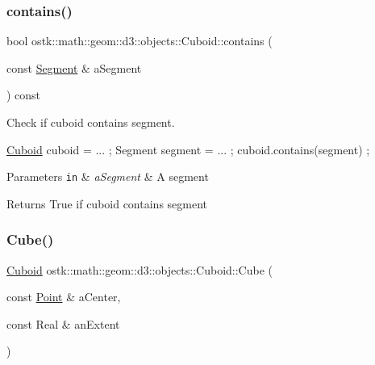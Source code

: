 \subsubsection{\texorpdfstring{contains()}{contains()}\hspace{0.1cm}{\footnotesize\ttfamily [3/3]}}
{\footnotesize\ttfamily bool ostk\+::math\+::geom\+::d3\+::objects\+::\+Cuboid\+::contains (\begin{DoxyParamCaption}\item[{const \hyperlink{classostk_1_1math_1_1geom_1_1d3_1_1objects_1_1_segment}{Segment} \&}]{a\+Segment }\end{DoxyParamCaption}) const}



Check if cuboid contains segment. 


\begin{DoxyCode}
\hyperlink{classostk_1_1math_1_1geom_1_1d3_1_1objects_1_1_cuboid_a1da071d7cbb0a694348628f098f77c5b}{Cuboid} cuboid = ... ;
Segment segment = ... ;
cuboid.contains(segment) ;
\end{DoxyCode}



\begin{DoxyParams}[1]{Parameters}
\mbox{\tt in}  & {\em a\+Segment} & A segment \\
\hline
\end{DoxyParams}
\begin{DoxyReturn}{Returns}
True if cuboid contains segment 
\end{DoxyReturn}
\mbox{\label{classostk_1_1math_1_1geom_1_1d3_1_1objects_1_1_cuboid_a6a42b2d344c9a6e12feef60ceea77b9d}} 
\subsubsection{\texorpdfstring{Cube()}{Cube()}}
{\footnotesize\ttfamily \hyperlink{classostk_1_1math_1_1geom_1_1d3_1_1objects_1_1_cuboid}{Cuboid} ostk\+::math\+::geom\+::d3\+::objects\+::\+Cuboid\+::\+Cube (\begin{DoxyParamCaption}\item[{const \hyperlink{classostk_1_1math_1_1geom_1_1d3_1_1objects_1_1_point}{Point} \&}]{a\+Center,  }\item[{const Real \&}]{an\+Extent }\end{DoxyParamCaption})\hspace{0.3cm}{\ttfamily [static]}}



